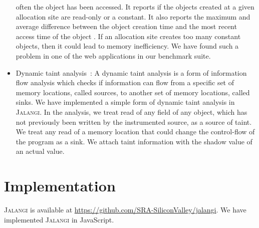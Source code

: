 \documentclass{sig-alternate}
\def\jalangi{\textsc{Jalangi}}
\begin{document}
\begin{itemize}
  often the object has been accessed.  It reports if the objects
  created at a given allocation site are read-only or a constant.  It
  also reports the maximum and average difference between the object
  creation time and the most recent access time of the object .  If an
  allocation site creates too many constant objects, then it could lead
  to memory inefficiency.  We have found such a problem in one of the
  web applications in our benchmark suite.
\item Dynamic taint analysis~\cite{songndss05}: A dynamic taint
  analysis is a form of information flow analysis which checks if
  information can flow from a specific set of memory locations, called
  sources, to another set of memory locations, called sinks.  We have
  implemented a simple form of dynamic taint analysis in \jalangi{}.
  In the analysis, we treat read of any field of any object, which has
  not previously been written by the instrumented source, as a source
  of taint.  We treat any read of a memory location that could change
  the control-flow of the program as a sink.  We attach taint
  information with the shadow value of an actual value.
\end{itemize}


\section{Implementation}
\label{sec:implementation}

\jalangi{} is available at
\url{https://github.com/SRA-SiliconValley/jalangi}.  We have
implemented \jalangi{} in JavaScript.
\end{document}

